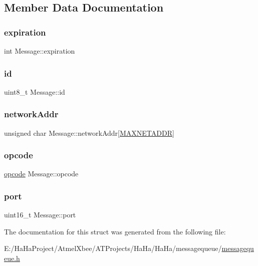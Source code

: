 \subsection{Member Data Documentation}
\mbox{\label{struct_message_a32a531677df2b9665eea1d997293688f}} 
\subsubsection{\texorpdfstring{expiration}{expiration}}
{\footnotesize\ttfamily int Message\+::expiration}

\mbox{\label{struct_message_ae61f86cd0691a3f02faa414da330a780}} 
\subsubsection{\texorpdfstring{id}{id}}
{\footnotesize\ttfamily uint8\+\_\+t Message\+::id}

\mbox{\label{struct_message_a60e639c0a4a6bce92868038dcd729d83}} 
\subsubsection{\texorpdfstring{network\+Addr}{networkAddr}}
{\footnotesize\ttfamily unsigned char Message\+::network\+Addr\mbox{[}\hyperlink{packet_8h_a64e48eb75238bd3d7a053f19071044a8}{M\+A\+X\+N\+E\+T\+A\+D\+DR}\mbox{]}}

\mbox{\label{struct_message_a1b33863bc276c3766459cb2199492c89}} 
\subsubsection{\texorpdfstring{opcode}{opcode}}
{\footnotesize\ttfamily \hyperlink{packet_8h_a5ce68aceddf17a30aa045fc04914e798}{opcode} Message\+::opcode}

\mbox{\label{struct_message_a02bae243e9df49d0baaf486c03b908dd}} 
\subsubsection{\texorpdfstring{port}{port}}
{\footnotesize\ttfamily uint16\+\_\+t Message\+::port}



The documentation for this struct was generated from the following file\+:\begin{DoxyCompactItemize}
\item 
E\+:/\+Ha\+Ha\+Project/\+Atmel\+Xbee/\+A\+T\+Projects/\+Ha\+Ha/\+Ha\+Ha/messagequeue/\hyperlink{messagequeue_8h}{messagequeue.\+h}\end{DoxyCompactItemize}
